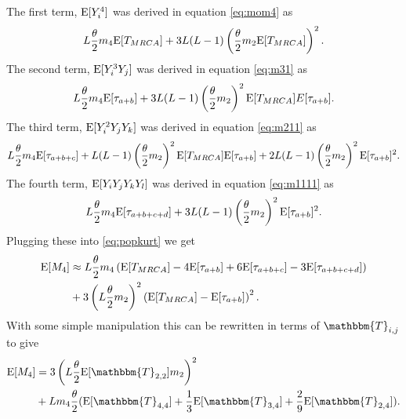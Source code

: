 The first term, $\mathrm{E}[Y_i^4]$ was derived in equation \eqref{eq:mom4} as
\begin{equation*}
  L\frac{\theta}{2} m_4 \mathrm{E}[T_{MRCA}] + 3L(L-1)\left( \frac{\theta}{2} m_2 \mathrm{E}[T_{MRCA}] \right)^2.
\end{equation*}
The second term, $\mathrm{E}[Y_i^3Y_j]$ was derived in equation \eqref{eq:m31} as
\begin{equation*}
  L \frac{\theta}{2} m_4 \mathrm{E}[\tau_{a+b}] + 3L(L-1) \left(\frac{\theta}{2} m_2\right)^2 \mathrm{E}[T_{MRCA}]\\E[\tau_{a+b}].
\end{equation*}
The third term, $\mathrm{E}[Y_i^2Y_jY_k]$ was derived in equation \eqref{eq:m211} as
\begin{equation*}
  L \frac{\theta}{2} m_4 \mathrm{E}[\tau_{a+b+c}] + L(L-1)\left(\frac{\theta}{2} m_2\right)^2\mathrm{E}[T_{MRCA}]\mathrm{E}[\tau_{a+b}] +
  2L(L-1) \left(\frac{\theta}{2} m_2\right)^2\mathrm{E}[\tau_{a+b}]^2.
\end{equation*}
The fourth term, $\mathrm{E}[Y_iY_jY_kY_l]$ was derived in equation \eqref{eq:m1111} as
\begin{equation*}
  L \frac{\theta}{2} m_4 \mathrm{E}[\tau_{a+b+c+d}] + 3L(L-1)\left(\frac{\theta}{2} m_2\right)^2\mathrm{E}[\tau_{a+b}]^2.
\end{equation*}
Plugging these into \eqref{eq:popkurt} we get
\begin{align}
  \label{eq:popm4coal}
  \mathrm{E}[M_4] &\approx L \frac{\theta}{2} m_4 \left( \mathrm{E}[T_{MRCA}] - 4\mathrm{E}[\tau_{a+b}] + 6\mathrm{E}[\tau_{a+b+c}] -3\mathrm{E}[\tau_{a+b+c+d}] \right)\nonumber \\
  &+ 3\left( L \frac{\theta}{2} m_2 \right)^2\left(\mathrm{E}[T_{MRCA}]- \mathrm{E}[\tau_{a+b}]\right)^2.
\end{align}
With some simple manipulation this can be rewritten in terms of
$\mathbbm{T}_{i,j}$ to give
\begin{align}
  \E[M_4] &= 3\left(L \T \E[\mathbbm{T}_{2,2}] m_2\right)^2 \nonumber \\
  &+ L m_4 \T ( \E[\mathbbm{T}_{4,4}] + \frac{1}{3} \E[\mathbbm{T}_{3,4}] +
    \frac{2}{9} \E[\mathbbm{T}_{2,4}] ).
\end{align}
